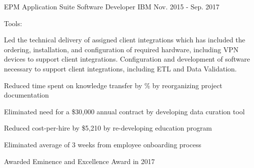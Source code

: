 \begin{cventries}
  \cvexpentry
    {EPM Application Suite} %
    {Software Developer} %
    {IBM}
    {Nov. 2015 - Sep. 2017}
    {
      \begin{cvheavyparagraph}
        Tools:
      \end{cvheavyparagraph}
    }
    {
      \begin{cvparagraph}
        Led the technical delivery of assigned client integrations which has included the ordering, installation, and configuration of required hardware, including VPN devices to support client integrations.  Configuration and development of software necessary to support client integrations, including ETL and Data Validation.
      \end{cvparagraph}
      \begin{cvitems} %
        \item {Reduced time spent on knowledge transfer by \% by reorganizing project documentation}
        \item {Eliminated need for a \$30,000 annual contract by developing data curation tool}
        \item {Reduced cost-per-hire by \$5,210 by re-developing education program}
        \item {Eliminated average of 3 weeks from employee onboarding process}
        \item {Awarded Eminence and Excellence Award in 2017}
      \end{cvitems}
    }


\end{cventries}
